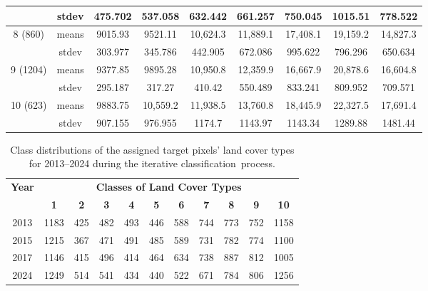 \documentclass[jmse,article,accept,pdftex,oneauthor]{Definitions/mdpi}
\renewcommand{\arraystretch}{0.7}
\begin{document}
\begin{table}[H]
\begin{tabular}{ccccccccc}
    & stdev & 475.702 & 537.058 & 632.442 & 661.257 & 750.045 & 1015.51 & 778.522 \\
    \midrule
    \multirow{2}{*}{8 (860)} & means & 9015.93 & 9521.11 & 10,624.3 & 11,889.1 & 17,408.1 & 19,159.2 & 14,827.3 \\
    & stdev & 303.977 & 345.786 & 442.905 & 672.086 & 995.622 & 796.296 & 650.634 \\
    \midrule
    \multirow{2}{*}{9 (1204)} & means & 9377.85 & 9895.28 & 10,950.8 & 12,359.9 & 16,667.9 & 20,878.6 & 16,604.8 \\
    & stdev & 295.187 & 317.27 & 410.42 & 550.489 & 833.241 & 809.952 & 709.571 \\
    \midrule
    \multirow{2}{*}{10 (623)} & means & 9883.75 & 10,559.2 & 11,938.5 & 13,760.8 & 18,445.9 & 22,327.5 & 17,691.4 \\
    & stdev & 907.155 & 976.955 & 1174.7 & 1143.97 & 1143.34 & 1289.88 & 1481.44 \\

\bottomrule
\end{tabular}
 
  
\end{table}

\vspace{-9pt}

\begin{table}[H]\renewcommand\arraystretch{1.2}
  \caption{Class distributions of the assigned target pixels' %
  	land cover types for 2013--2024 during the iterative classification~process. \label{tab07}}
 \setlength{\tabcolsep}{3.42mm}
   \begin{tabular}{ccccccccccc}
  \toprule
  \multirow{2}{*}{\textbf{Year}} & \multicolumn{10}{c}{\textbf{Classes of Land Cover Types}} \\
     & \textbf{1} & \textbf{2} &  \textbf{3} & \textbf{4} & \textbf{5} & \textbf{6} & \textbf{7} & \textbf{8} & \textbf{9} & \textbf{10} \\
    \midrule
    2013 & 1183 & 425 & 482 & 493 & 446 & 588 & 744 & 773 & 752 & 1158 \\
    2015 & 1215 & 367 & 471 & 491 & 485 & 589 & 731 & 782 & 774 & 1100 \\
    2017 & 1146 & 415 & 496 & 414 & 464 & 634 & 738 & 887 & 812 & 1005 \\
    2024 & 1249 & 514 & 541 & 434 & 440 & 522 & 671 & 784 & 806 & 1256 \\
\bottomrule
\end{tabular}

  
\end{table} 
\end{document}
